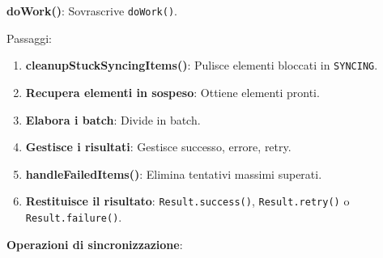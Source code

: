 \textbf{doWork()}: Sovrascrive \texttt{doWork()}.

Passaggi:
\begin{enumerate}
    \item \textbf{cleanupStuckSyncingItems()}: Pulisce elementi bloccati in \texttt{SYNCING}.
    \item \textbf{Recupera elementi in sospeso}: Ottiene elementi pronti.
    \item \textbf{Elabora i batch}: Divide in batch.
    \item \textbf{Gestisce i risultati}: Gestisce successo, errore, retry.
    \item \textbf{handleFailedItems()}: Elimina tentativi massimi superati.
    \item \textbf{Restituisce il risultato}: \texttt{Result.success()}, \texttt{Result.retry()} o \texttt{Result.failure()}.
\end{enumerate}

\textbf{Operazioni di sincronizzazione}:

